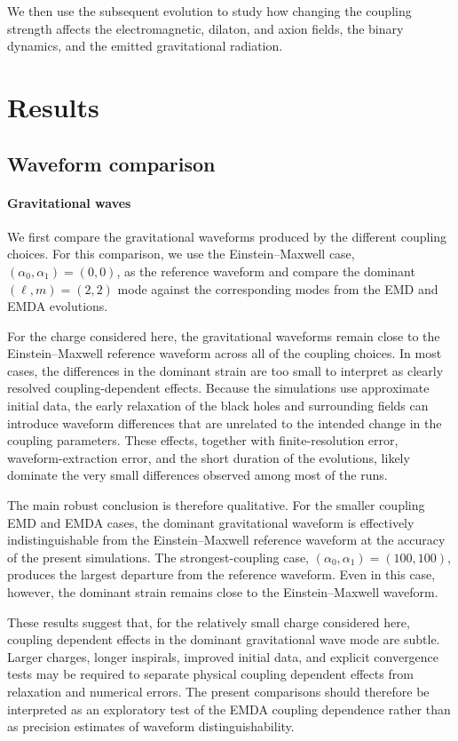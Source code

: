We then use the subsequent evolution to study how changing the coupling strength affects the electromagnetic, dilaton, and axion fields, the binary dynamics, and the emitted gravitational radiation.

\section{Results}

\subsection{Waveform comparison}

\paragraph{Gravitational waves}

We first compare the gravitational waveforms produced by the different coupling choices. For this comparison, we use the Einstein--Maxwell case, $(\alpha_0,\alpha_1)=(0,0)$, as the reference waveform and compare the dominant $(\ell,m)=(2,2)$ mode against the corresponding modes from the EMD and EMDA evolutions.

For the charge considered here, the gravitational waveforms remain close to the Einstein--Maxwell reference waveform across all of the coupling choices. In most cases, the differences in the dominant strain are too small to interpret as clearly resolved coupling-dependent effects. Because the simulations use approximate initial data, the early relaxation of the black holes and surrounding fields can introduce waveform differences that are unrelated to the intended change in the coupling parameters. These effects, together with finite-resolution error, waveform-extraction error, and the short duration of the evolutions, likely dominate the very small differences observed among most of the runs.

The main robust conclusion is therefore qualitative. For the smaller coupling EMD and EMDA cases, the dominant gravitational waveform is effectively indistinguishable from the Einstein--Maxwell reference waveform at the accuracy of the present simulations. The strongest-coupling case, $(\alpha_0,\alpha_1)=(100,100)$, produces the largest departure from the reference waveform. Even in this case, however, the dominant strain remains close to the Einstein--Maxwell waveform.

These results suggest that, for the relatively small charge considered here, coupling dependent effects in the dominant gravitational wave mode are subtle. Larger charges, longer inspirals, improved initial data, and explicit convergence tests may be required to separate physical coupling dependent effects from relaxation and numerical errors. The present comparisons should therefore be interpreted as an exploratory test of the EMDA coupling dependence rather than as precision estimates of waveform distinguishability.

